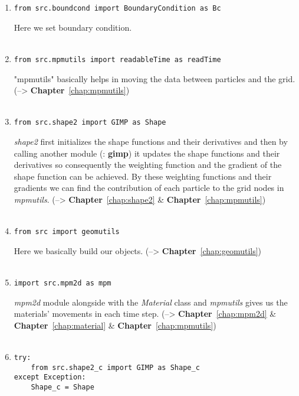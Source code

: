 \documentclass[11pt,fleqn]{book} %
\begin{document}
\begin{enumerate}
\item 
\begin{lstlisting}
from src.boundcond import BoundaryCondition as Bc
\end{lstlisting}
Here we set boundary condition.\\ \\
\item 
\begin{lstlisting}
from src.mpmutils import readableTime as readTime
\end{lstlisting}
"mpmutils" basically helps in moving the data between particles and the grid. (--> \textbf{Chapter}~\ref{chap:mpmutils})\\ \\
\item 
\begin{lstlisting}
from src.shape2 import GIMP as Shape    
\end{lstlisting}
\emph{shape2} first initializes the shape functions and their derivatives and then by calling another module (: \textbf{gimp}) it updates the shape functions and their derivatives so consequently the weighting function and the gradient of the shape function can be achieved. By these weighting functions and their gradients we can find the
contribution of each particle to the grid nodes in \emph{mpmutils}. (--> \textbf{Chapter}~\ref{chap:shape2} \& \textbf{Chapter}~\ref{chap:mpmutils}) \\ \\
\item 
\begin{lstlisting}
from src import geomutils
\end{lstlisting}
Here we basically build our objects. (--> \textbf{Chapter}~\ref{chap:geomutils})\\ \\
\item \begin{lstlisting}
import src.mpm2d as mpm
\end{lstlisting}
\emph{mpm2d} module alongside with the \emph{Material} class and \emph{mpmutils} gives us the materials' movements in each time step. (--> \textbf{Chapter}~\ref{chap:mpm2d} \& \textbf{Chapter}~\ref{chap:material} \& \textbf{Chapter}~\ref{chap:mpmutils}) \\ \\
\item 
\begin{lstlisting}
try:
    from src.shape2_c import GIMP as Shape_c
except Exception:
    Shape_c = Shape
\end{lstlisting}

\end{enumerate}
\end{document}
